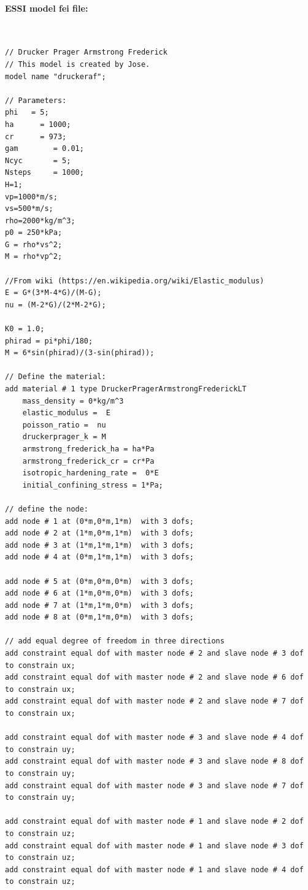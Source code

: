 \paragraph{ESSI model fei file: } ~

%

\begin{lstlisting}
// Drucker Prager Armstrong Frederick
// This model is created by Jose.
model name "druckeraf";

// Parameters:
phi   = 5;
ha      = 1000;
cr      = 973;
gam        = 0.01;
Ncyc       = 5;
Nsteps     = 1000;
H=1;
vp=1000*m/s;
vs=500*m/s; 
rho=2000*kg/m^3;
p0 = 250*kPa;
G = rho*vs^2;
M = rho*vp^2;

//From wiki (https://en.wikipedia.org/wiki/Elastic_modulus)
E = G*(3*M-4*G)/(M-G);
nu = (M-2*G)/(2*M-2*G);

K0 = 1.0;
phirad = pi*phi/180;
M = 6*sin(phirad)/(3-sin(phirad));

// Define the material:
add material # 1 type DruckerPragerArmstrongFrederickLT
    mass_density = 0*kg/m^3 
    elastic_modulus =  E
    poisson_ratio =  nu
    druckerprager_k = M
    armstrong_frederick_ha = ha*Pa 
    armstrong_frederick_cr = cr*Pa
    isotropic_hardening_rate =  0*E
    initial_confining_stress = 1*Pa;

// define the node:
add node # 1 at (0*m,0*m,1*m)  with 3 dofs;
add node # 2 at (1*m,0*m,1*m)  with 3 dofs;
add node # 3 at (1*m,1*m,1*m)  with 3 dofs;
add node # 4 at (0*m,1*m,1*m)  with 3 dofs;

add node # 5 at (0*m,0*m,0*m)  with 3 dofs;
add node # 6 at (1*m,0*m,0*m)  with 3 dofs;
add node # 7 at (1*m,1*m,0*m)  with 3 dofs;
add node # 8 at (0*m,1*m,0*m)  with 3 dofs;

// add equal degree of freedom in three directions
add constraint equal dof with master node # 2 and slave node # 3 dof to constrain ux;
add constraint equal dof with master node # 2 and slave node # 6 dof to constrain ux;
add constraint equal dof with master node # 2 and slave node # 7 dof to constrain ux;

add constraint equal dof with master node # 3 and slave node # 4 dof to constrain uy;
add constraint equal dof with master node # 3 and slave node # 8 dof to constrain uy;
add constraint equal dof with master node # 3 and slave node # 7 dof to constrain uy;

add constraint equal dof with master node # 1 and slave node # 2 dof to constrain uz;
add constraint equal dof with master node # 1 and slave node # 3 dof to constrain uz;
add constraint equal dof with master node # 1 and slave node # 4 dof to constrain uz;


\end{lstlisting}
